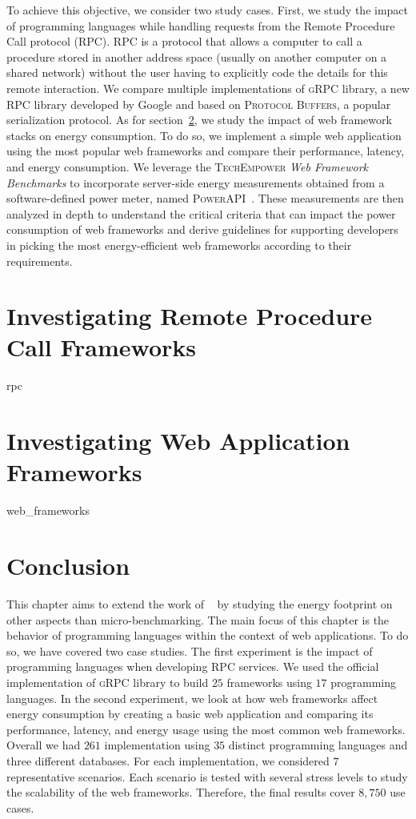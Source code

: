 To achieve this objective, we consider two study cases.
First, we study the impact of programming languages while handling requests from the Remote Procedure Call protocol (RPC).
RPC is a protocol that allows a computer to call a procedure stored in another address space (usually on another computer on a shared network) without the user having to explicitly code the details for this remote interaction.
We compare multiple implementations of \textsc{gRPC} library, a new RPC library developed by Google and based on \textsc{Protocol Buffers}, a popular serialization protocol.
As for section~\ref{sec:webframework}, we study the impact of web framework stacks on energy consumption. To do so, we implement a simple web application using the most popular web frameworks and compare their performance, latency, and energy consumption.  We leverage the \textsc{TechEmpower} \emph{Web Framework Benchmarks} to incorporate server-side energy measurements obtained from a software-defined power meter, named \textsc{PowerAPI}~\cite{fieni2020smartwatts}.
These measurements are then analyzed in depth to understand the critical criteria that can impact the power consumption of web frameworks and derive guidelines for supporting developers in picking the most energy-efficient web frameworks according to their requirements.


\section{Investigating Remote Procedure Call Frameworks}
{rpc}

\section{Investigating Web Application Frameworks}\label{sec:webframework}

{web_frameworks}

\section{Conclusion}
This chapter aims to extend the work of \citeauthor{pereira_energy_2017}~\cite{pereira_energy_2017} by studying the energy footprint on other aspects than micro-benchmarking.
The main focus of this chapter is the behavior of programming languages within the context of web applications.
To do so, we have covered two case studies.
The first experiment is the impact of programming languages when developing RPC services.
We used the official implementation of \textsc{gRPC} library to build $25$ frameworks using $17$ programming languages.
In the second experiment, we look at how web frameworks affect energy consumption by creating a basic web application and comparing its performance, latency, and energy usage using the most common web frameworks.
Overall we had $261$ implementation using $35$ distinct programming languages and three different databases.
For each implementation, we considered $7$ representative scenarios.
Each scenario is tested with several stress levels to study the scalability of the web frameworks.
Therefore, the final results cover $8,750$ use cases.

